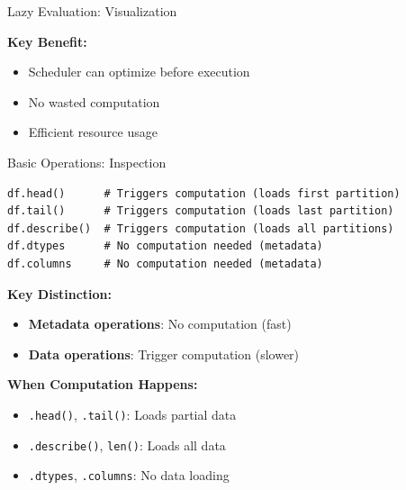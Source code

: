 \documentclass[aspectratio=169]{beamer}
\begin{document}
\begin{frame}{Lazy Evaluation: Visualization}
\small
\begin{center}
\end{center}

\vspace{0.2cm}
\textbf{Key Benefit:}
\begin{itemize}
    \item Scheduler can optimize before execution
    \item No wasted computation
    \item Efficient resource usage
\end{itemize}
\end{frame}

\begin{frame}[fragile]{Basic Operations: Inspection}
\small
\begin{lstlisting}
df.head()      # Triggers computation (loads first partition)
df.tail()      # Triggers computation (loads last partition)
df.describe()  # Triggers computation (loads all partitions)
df.dtypes      # No computation needed (metadata)
df.columns     # No computation needed (metadata)
\end{lstlisting}

\textbf{Key Distinction:}
\begin{itemize}
    \item \textbf{Metadata operations}: No computation (fast)
    \item \textbf{Data operations}: Trigger computation (slower)
\end{itemize}

\vspace{0.15cm}
\textbf{When Computation Happens:}
\begin{itemize}
    \item \texttt{.head()}, \texttt{.tail()}: Loads partial data
    \item \texttt{.describe()}, \texttt{len()}: Loads all data
    \item \texttt{.dtypes}, \texttt{.columns}: No data loading
\end{itemize}
\end{frame}
\end{document}
